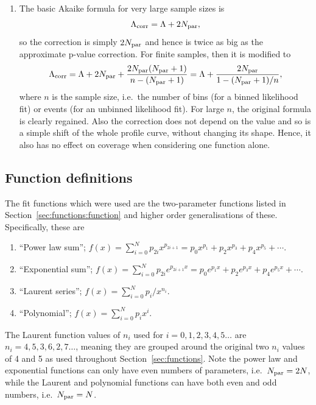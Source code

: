 \begin{enumerate}
\item %
The basic Akaike formula for very large sample sizes is
\begin{displaymath}
\Lambda_{\mathrm{corr}} = \textrm{\ensuremath{\Lambda}} + 2N_{\rm par},
\end{displaymath}
so the correction is simply $ 2N_{\rm par}$ and
hence is twice as big as the approximate p-value correction.
For finite samples, then it is modified to
\begin{displaymath}
\Lambda_{\mathrm{corr}}
= \textrm{\ensuremath{\Lambda}} + 2N_{\rm par}  + \frac{2N_{\rm par}(N_{\rm par}+1)}{n-(N_{\rm par}+1)}
= \textrm{\ensuremath{\Lambda}} + \frac{2N_{\rm par}}{1-(N_{\rm par}+1)/n},
\end{displaymath}
where $n$ is the sample size, i.e.~the number of bins (for a binned likelihood
fit) or events (for an unbinned likelihood fit). For large $n$, the original
formula is clearly regained.
Also the correction does not depend on the \nll value and
so is a simple shift of
the whole profile curve, without changing its shape.
Hence, it also has no effect on coverage when considering one function alone.
\end{enumerate}

\subsection{Function definitions}
\label{sec:correction:functions}
The fit functions which were used are the two-parameter functions listed in
Section~\ref{sec:functions:function} and higher order generalisations of
these. Specifically, these are
\begin{enumerate}
\item
``Power law sum''; $f(x) = \sum_{i=0}^N p_{2i} x^{p_{2i+1}} = p_{0}x^{p_{1}} + p_{2}x^{p_{3}} + p_{4}x^{p_{5}}+\cdots$.
\item
``Exponential sum''; $f(x) = \sum_{i=0}^N p_{2i} e^{p_{2i+1}x} = p_{0} e^{p_{1}x} + p_{2} e^{p_{3}x} + p_{4} e^{p_{5}x}+\cdots$.
\item
``Laurent series''; $f(x) = \sum_{i=0}^N p_i/x^{n_i}$.
\item
``Polynomial''; $f(x) = \sum_{i=0}^N p_i x^i$.
\end{enumerate}
The Laurent function values of $n_{i}$ used for $i=0,1,2,3,4,5\dots$ are
$n_{i}=4,5,3,6,2,7\dots$, meaning they are grouped around the original
two $n_{i}$ values of 4 and 5 as used throughout Section~\ref{sec:functions}.
Note the power law and exponential functions can only have even numbers of
parameters, i.e.~$N_{\rm par}=2N$, while the Laurent and polynomial functions
can have both even and odd numbers, i.e.~$N_{\rm par}=N$.


